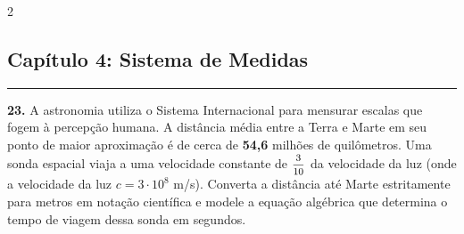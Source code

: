 \documentclass[twoside, 10pt, a4paper]{article}
\begin{document}
\begin{multicols*}{2}
\subsection*{Capítulo 4: Sistema de Medidas}
\vspace{-0.2cm}\noindent\rule{\linewidth}{1.5pt} 
\par\par\vspace{0.5cm}
\textbf{23.} A astronomia utiliza o Sistema Internacional para mensurar escalas que fogem à percepção humana. A distância média entre a Terra e Marte em seu ponto de maior aproximação é de cerca de \textbf{54,6} milhões de quilômetros. Uma sonda espacial viaja a uma velocidade constante de $ \mfrac{3}{10} $ da velocidade da luz (onde a velocidade da luz $c = 3 \cdot 10^8$ m/s). Converta a distância até Marte estritamente para metros em notação científica e modele a equação algébrica que determina o tempo de viagem dessa sonda em segundos.
\par\vspace{0.5cm}


\end{multicols*}
\end{document}
